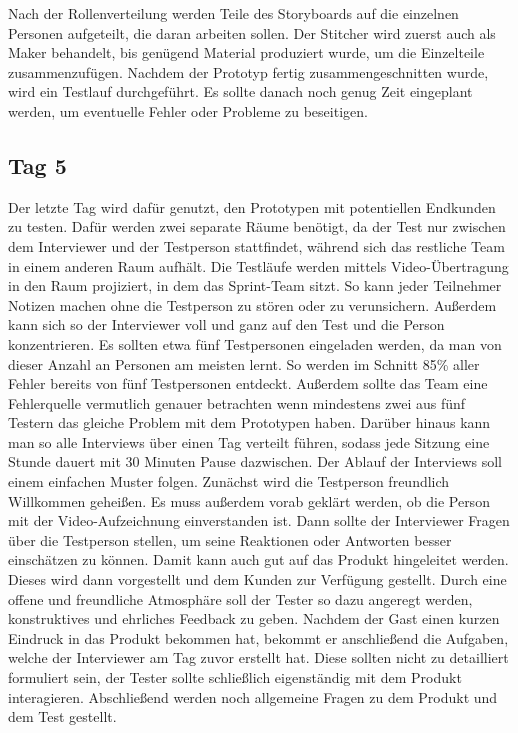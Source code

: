 Nach der Rollenverteilung werden Teile des Storyboards auf die einzelnen Personen aufgeteilt, die daran arbeiten sollen. Der Stitcher wird zuerst auch als Maker behandelt, bis genügend Material produziert wurde, um die Einzelteile zusammenzufügen. Nachdem der Prototyp fertig zusammengeschnitten wurde, wird ein Testlauf durchgeführt. Es sollte danach noch genug Zeit eingeplant werden, um eventuelle Fehler oder Probleme zu beseitigen.

\subsection*{\label{sec:Sprint-Tag5}\thesubsection\quad Tag 5}
Der letzte Tag wird dafür genutzt, den Prototypen mit potentiellen Endkunden zu testen. Dafür werden zwei separate Räume benötigt, da der Test nur zwischen dem Interviewer und der Testperson stattfindet, während sich das restliche Team in einem anderen Raum aufhält. Die Testläufe werden mittels Video-Übertragung in den Raum projiziert, in dem das Sprint-Team sitzt. So kann jeder Teilnehmer Notizen machen ohne die Testperson zu stören oder zu verunsichern. Außerdem kann sich so der Interviewer voll und ganz auf den Test und die Person konzentrieren. Es sollten etwa fünf Testpersonen eingeladen werden, da man von dieser Anzahl an Personen am meisten lernt. So werden im Schnitt 85\% aller Fehler bereits von fünf Testpersonen entdeckt. Außerdem sollte das Team eine Fehlerquelle vermutlich genauer betrachten wenn mindestens zwei aus fünf Testern das gleiche Problem mit dem Prototypen haben.\cite{nielsen1993mathematical}
Darüber hinaus kann man so alle Interviews über einen Tag verteilt führen, sodass jede Sitzung eine Stunde dauert mit 30 Minuten Pause dazwischen. Der Ablauf der Interviews soll einem einfachen Muster folgen. Zunächst wird die Testperson freundlich Willkommen geheißen. Es muss außerdem vorab geklärt werden, ob die Person mit der Video-Aufzeichnung einverstanden ist. Dann sollte der Interviewer Fragen über die Testperson stellen, um seine Reaktionen oder Antworten besser einschätzen zu können. Damit kann auch gut auf das Produkt hingeleitet werden. Dieses wird dann vorgestellt und dem Kunden zur Verfügung gestellt. Durch eine offene und freundliche Atmosphäre soll der Tester so dazu angeregt werden, konstruktives und ehrliches Feedback zu geben. Nachdem der Gast einen kurzen Eindruck in das Produkt bekommen hat, bekommt er anschließend die Aufgaben, welche der Interviewer am Tag zuvor erstellt hat. Diese sollten nicht zu detailliert formuliert sein, der Tester sollte schließlich eigenständig mit dem Produkt interagieren. Abschließend werden noch allgemeine Fragen zu dem Produkt und dem Test gestellt.

